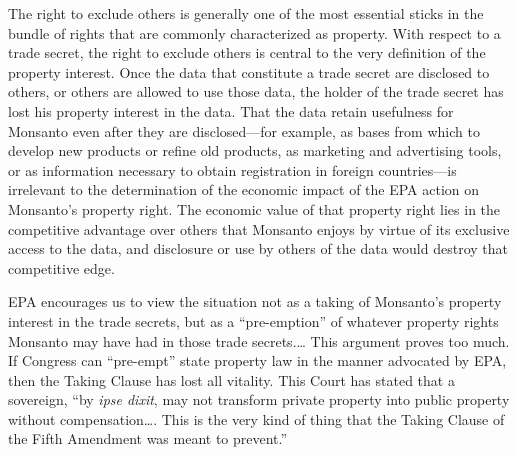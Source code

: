 The right to exclude others is generally one of the most essential sticks in
the bundle of rights that are commonly characterized as property.
With respect to a trade secret, the
right to exclude others is central to the very definition of the property
interest. Once the data that constitute a trade secret are disclosed to others,
or others are allowed to use those data, the holder of the trade secret has lost
his property interest in the data.  That the data retain usefulness for Monsanto even after they are
disclosed---for example, as bases from which to develop new products or refine
old products, as marketing and advertising tools, or as information necessary to
obtain registration in foreign countries---is irrelevant to the determination of
the economic impact of the EPA action on Monsanto's property right. The economic
value of that property right lies in the competitive advantage over others that
Monsanto enjoys by virtue of its exclusive access to the data, and disclosure or
use by others of the data would destroy that competitive edge.

EPA encourages us to view the situation not as a taking of Monsanto's property
interest in the trade secrets, but as a ``pre-emption'' of whatever property
rights Monsanto may have had in those trade secrets.\ldots
This argument proves too much. If Congress can ``pre-empt'' state property
law in the manner advocated by EPA, then the Taking Clause has lost all
vitality. This Court has stated that a sovereign, ``by \textit{ipse dixit}, may
not transform private property into public property without compensation\ldots.
This is the very kind of thing that the Taking Clause of the Fifth Amendment was
meant to prevent.''


